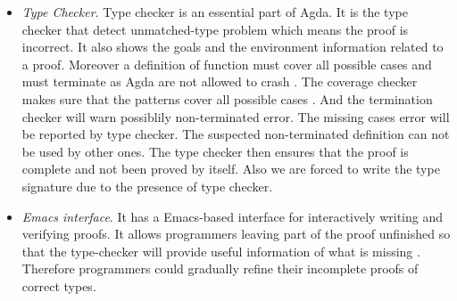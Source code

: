 \documentclass{article}
\theoremstyle{definition}
\begin{document}
\begin{itemize}
\item \textit{Type Checker}. Type checker is an essential part of Agda. It is the type checker that detect unmatched-type problem which means the proof is incorrect. It also shows the goals and the environment information related to a proof. Moreover a definition of function must cover all possible cases and must terminate as Agda are not allowed to crash \cite{tutorial}. The coverage checker makes sure that the patterns cover all possible cases \cite{aboa}. And the termination checker will warn possiblily non-terminated error. The missing cases error will be reported by type checker. The suspected non-terminated definition can not be used by other ones. The type checker then ensures that the proof is complete and not been proved by itself. Also we are forced to write the type signature due to the presence of type checker.
 
\item \textit{Emacs interface}. It has a Emacs-based interface for interactively writing and verifying proofs. It allows programmers leaving part of the proof unfinished so that the type-checker will provide useful information of what is missing \cite{aboa}. Therefore programmers could gradually refine their incomplete proofs of correct types.



\end{itemize}
\end{document}
